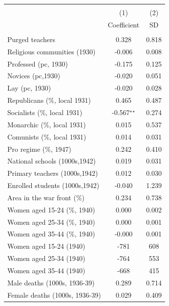 \begin{tabular}{l c c }\hline\hline  \\[-0.3cm] & (1) & (2)  \\ [0.1cm] & {Coefficient} & {SD}  \\ [0.1cm] \hline \\ 
Purged teachers&	0.328&	0.818	\\
Religious communities (1930)&	-0.006&	0.008	\\
Professed (pc, 1930)&	-0.175&	0.125	\\
Novices (pc,1930)&	-0.020&	0.051	\\
Lay (pc, 1930)&	-0.020&	0.028	\\
Republicans (\%, local 1931)&	0.465&	0.487	\\
Socialists (\%, local 1931)&	-0.567$^\star$$^\star$&	0.274	\\
Monarchic (\%, local 1931)&	0.015&	0.537	\\
Comunists (\%, local 1931)&	0.014&	0.031	\\
Pro regime (\%, 1947)&	0.242&	0.410	\\
National schools (1000s,1942)&	0.019&	0.031	\\
Primary teachers (1000s,1942)&	0.012&	0.030	\\
Enrolled students (1000s,1942)&	-0.040&	1.239	\\
Area in the war front (\%)&	0.234&	0.738	\\
Women aged 15-24 (\%, 1940) &	0.000&	0.002	\\
Women aged 25-34 (\%, 1940) &	0.000&	0.001	\\
Women aged 35-44 (\%, 1940) &	-0.000&	0.001	\\
Women aged 15-24 (1940) &	-781&	608	\\
Women aged 25-34 (1940) &	-764&	553	\\
Women aged 35-44 (1940) &	-668&	415	\\
Male deaths (1000s, 1936-39)&	0.289&	0.714	\\
Female deaths (1000s, 1936-39)&	0.029&	0.409	\\
\hline\hline \end{tabular}